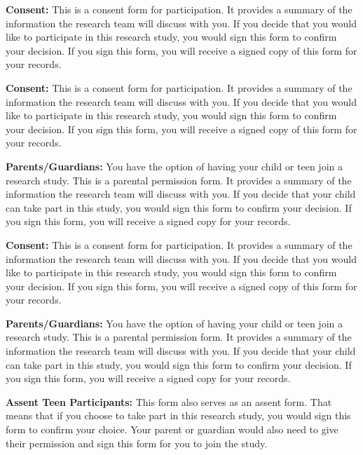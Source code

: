 \documentclass[11pt]{article}
\begin{document}


\newcommand{\defconsent}{%
\textbf{Consent:} This is a consent form for participation. It provides a summary of the information the
research team will discuss with you. If you decide that you would like to participate in this
research study, you would sign this form to confirm your decision. If you sign this form,
you will receive a signed copy of this form for your records.
}

\newcommand{\defparent}{%
\textbf{Parents/Guardians:} You have the option of having your child or teen join a research study. This is
a parental permission form. It provides a summary of the information the research team will discuss with you.
If you decide that your child can take part in this study, you would sign this form to confirm your decision.
If you sign this form, you will receive a signed copy for your records.
}

\newcommand{\defassent}{%
\textbf{Assent Teen Participants:} This form also serves as an assent form. That means that if you choose to
take part in this research study, you would sign this form to confirm your choice. Your parent or guardian
would also need to give their permission and sign this form for you to join the study.
}

\newcommand{\defcontinued}{%
\textbf{Consent for Continued Participation (Participants who turn 18 during the study):}
This is a consent form for continued participation. It provides a summary of the information the
research team will discuss with you. If you decide that you would like to continue participating in
this research study, you would sign this form to confirm your decision. If you sign this form, you
will receive a signed copy of this form for your records.
}

%
{%
\defconsent
}%
{}%

%
{%
\defconsent

\defparent
}%
{}%

%
{%
\defconsent

\defparent

\defassent
}%
{}%
\end{document}
